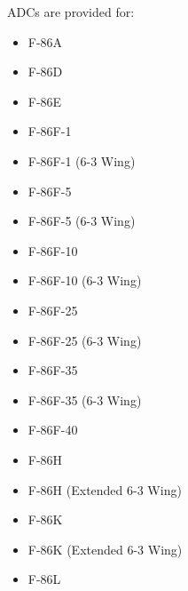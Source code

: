 ADCs are provided for:
\begin{itemize}
    \item F-86A
    \item F-86D
    \item F-86E
    \item F-86F-1
    \item F-86F-1 (6-3 Wing)
    \item F-86F-5
    \item F-86F-5 (6-3 Wing)
    \item F-86F-10
    \item F-86F-10 (6-3 Wing)
    \item F-86F-25
    \item F-86F-25 (6-3 Wing)
    \item F-86F-35
    \item F-86F-35 (6-3 Wing)
    \item F-86F-40
    \item F-86H
    \item F-86H (Extended 6-3 Wing)
    \item F-86K
    \item F-86K (Extended 6-3 Wing)
    \item F-86L
\end{itemize}